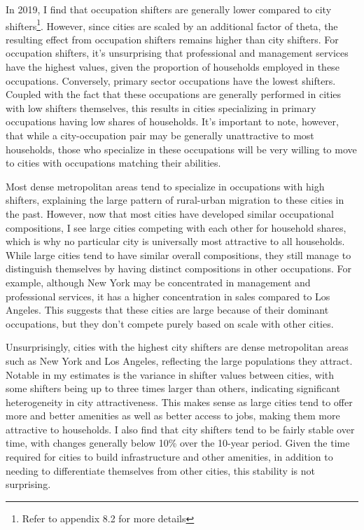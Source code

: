 \documentclass[10pt]{article}
\begin{document}


In 2019, I find that occupation shifters are generally lower compared to city shifters\footnote{Refer to appendix 8.2 for more details}. However, since cities are scaled by an additional factor of theta, the resulting effect from occupation shifters remains higher than city shifters. For occupation shifters, it's unsurprising that professional and management services have the highest values, given the proportion of households employed in these occupations. Conversely, primary sector occupations have the lowest shifters. Coupled with the fact that these occupations are generally performed in cities with low shifters themselves, this results in cities specializing in primary occupations having low shares of households. It's important to note, however, that while a city-occupation pair may be generally unattractive to most households, those who specialize in these occupations will be very willing to move to cities with occupations matching their abilities.

Most dense metropolitan areas tend to specialize in occupations with high shifters, explaining the large pattern of rural-urban migration to these cities in the past. However, now that most cities have developed similar occupational compositions, I see large cities competing with each other for household shares, which is why no particular city is universally most attractive to all households. While large cities tend to have similar overall compositions, they still manage to distinguish themselves by having distinct compositions in other occupations. For example, although New York may be concentrated in management and professional services, it has a higher concentration in sales compared to Los Angeles. This suggests that these cities are large because of their dominant occupations, but they don't compete purely based on scale with other cities.

Unsurprisingly, cities with the highest city shifters are dense metropolitan areas such as New York and Los Angeles, reflecting the large populations they attract. Notable in my estimates is the variance in shifter values between cities, with some shifters being up to three times larger than others, indicating significant heterogeneity in city attractiveness. This makes sense as large cities tend to offer more and better amenities as well as better access to jobs, making them more attractive to households. I also find that city shifters tend to be fairly stable over time, with changes generally below 10\% over the 10-year period. Given the time required for cities to build infrastructure and other amenities, in addition to needing to differentiate themselves from other cities, this stability is not surprising.
\end{document}
